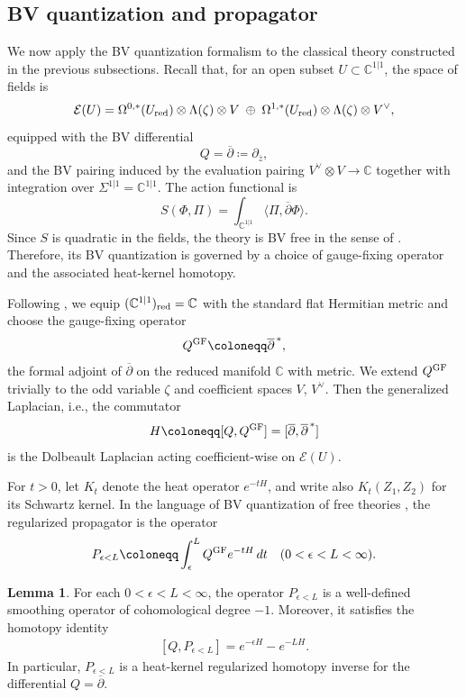 \documentclass[final,reqno]{amsart}
\numberwithin{equation}{section}
\theoremstyle{definition}
\newtheorem{lem}[thm]{Lemma}
\newcommand{\ep}{\epsilon}
\newcommand{\ol}{\overline}
\newcommand{\ceq}{\coloneqq} %
\newcommand{\GF}{\textup{GF}}
\newcommand{\tred}{\textup{red}}
\newcommand{\bbC}{\mathbb{C}}
\newcommand{\sC}{\mathbb{C}^{1|1}}
\newcommand{\clE}{\mathcal{E}}
\newcommand{\pd}{\partial}
\newcommand{\bpd}{\overline{\partial}}
\newcommand{\sSig}{\Sigma^{1|1}}
\begin{document}
\subsection{BV quantization and propagator}
\label{ss:2.9}

We now apply the BV quantization formalism to 
the classical theory constructed in the previous subsections. 
Recall that, for an open subset $U \subset \sC$, the space of fields is
\[
 \clE(U) = \Omega^{0,*}(U_{\tred}) \otimes \Lambda(\zeta)\otimes V \;\oplus\;
           \Omega^{1,*}(U_{\tred}) \otimes \Lambda(\zeta)\otimes V^\vee,
\]
equipped with the BV differential
\[
 Q = \bpd \ceq \pd_{\ol{z}},
\]
and the BV pairing induced by the evaluation pairing 
$V^\vee\otimes V\to \bbC$ together with integration over $\sSig=\sC$. 
The action functional is
\[
 S(\Phi,\Pi) = \int_{\sC} \langle \Pi,\bpd \Phi\rangle.
\]
Since $S$ is quadratic in the fields, 
the theory is BV free in the sense of \cite[Definition 7.2.1]{CG2}. 
Therefore, its BV quantization is governed by 
a choice of gauge-fixing operator and the associated heat-kernel homotopy.

Following \cite[\S7.2]{CG2}, we equip $(\sC)_{\tred}=\bbC$ 
with the standard flat Hermitian metric and choose the gauge-fixing operator
\begin{align}\label{eq:2:QGF}
 Q^{\GF} \ceq \bpd^{\,*},
\end{align}
the formal adjoint of $\bpd$ on the reduced manifold $\bbC$ with metric. 
We extend $Q^{\GF}$ trivially to the odd variable $\zeta$ 
and coefficient spaces $V$, $V^\vee$. 
Then the generalized Laplacian, i.e., the commutator
\begin{align}\label{eq:2:H}
 H \ceq [Q,Q^{\GF}] = [\bpd,\bpd^{\,*}]
\end{align}
is the Dolbeault Laplacian acting coefficient-wise on $\clE(U)$.

For $t>0$, let $K_t$ denote the heat operator $e^{-tH}$, 
and write also $K_t(Z_1,Z_2)$ for its Schwartz kernel. 
In the language of BV quantization of free theories \cite[\S8.2]{CG2}, 
the regularized propagator is the operator
\begin{align}\label{eq:2:PeL}
 P_{\ep<L} \ceq \int_\ep^L Q^{\GF} e^{-tH}\,dt \quad (0<\ep<L<\infty).
\end{align}

\begin{lem} %
For each $0<\ep<L<\infty$, the operator $P_{\ep<L}$ is 
a well-defined smoothing operator of cohomological degree $-1$. 
Moreover, it satisfies the homotopy identity
\begin{align}\label{eq:2:hot}
 [Q,P_{\ep<L}] = e^{-\ep H}-e^{-LH}.
\end{align}
In particular, $P_{\ep<L}$ is a heat-kernel regularized homotopy inverse 
for the differential $Q=\bpd$.
\end{lem}
\end{document}
